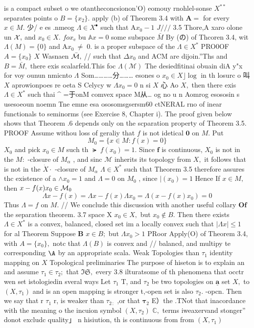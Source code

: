 is a compact subset o we otantheconcsionon'O) eomouy rnohlel-sonse $X^{\ast\ast}$ separates points o $B=\{x_{2}\}.$ apply (b) of Theorem 3.4 with ${\boldsymbol{A}}=$ for every $x\in M.$ 少/ e es .nmeog $\Lambda\in X^{\bullet}$ such that $\mathrm{A}x_{0}-1$ $J/{\big/}/$ 3.5 Thore,A xaro olone un ${\cal X},$ and $x_{0}\in X.$ $\scriptstyle f o x_{\mathrm{e}}$ bu $\mathbb{A}x=0$ some subspace $\bar{M}$ By (の) of Thcoren 3.4, wit $\Lambda(M)=\{0\}$ and $\mathrm{A}{x_{0}}~\neq\;0.$ is a proper subspace of the $\Lambda\in X^{*}$ PRO0OF $A=\{x_{0}\}$ $\textstyle X$ Wasnaen $\bar{\cal M},$ // such that $\Delta x_{0}$ and ACM are dijoin.”Ths and $B={\bar{M}},$ there exis scalarfeld.This foc $\Lambda(\mathcal{M})$ The desiedfitinai obuain diA y"x for voy ounun nmicnto $\Lambda$ Som…………分……… esones o $x_{0}\in X\rfloor\log$ in th losurc o 叫 $\textstyle X$ aprowionpoes re oeta S Celycy w $\Lambda x_{0}=0$ n si $X$ 心 Ao $X,$ then there exis $\Lambda\in X^{*}$ such thai ^ =于onM comvex space M从… og no u n Aomrog esososin s usesoeoun noemn Tne emne esa ososomsgsersm60 ctNERAL rno of inear functionals to seminorms (see Exercise 8, Chapter i). The proof given below shows that Theorem .6 depends only on the scparation property of Theorem 3.5. PROOF Assume withou loss of geraliy that $\boldsymbol{\mathit{f}}$ is not idetical ${\boldsymbol{0}}$ on $M.$ Put $$ M_{0}=\{x\in M\colon f(x)=0\} $$ $X_{0}$ and pick $x_{0}\in M$ such th $\mathrm{\lat}\;f(x_{0})=1.$ Since $\boldsymbol{f}$ is continuous, $X_{0}$ is not in the $M{\mathrm{:}}$ -closure of $\scriptstyle M_{\alpha}$ , and sinc $\mathcal{M}$ inherits its topology from $X,$ it follows that is not in the ${\dot{X}}\cdotp$ -closure of $\scriptstyle M_{\alpha}$ $\Lambda\in X^{*}$ such that Theorem 3.5 therefore assures thc existence of a $\wedge x_{0}=1$ and $\Lambda=0$ on $M_{0}$ , since $|(x_{0})=1$ Hence If $x\in M,$ then $x-f(x)x_{0}\in{\cal M}_{0}$ $$ \Lambda x-f(x)=\Lambda x-f(x)\Lambda x_{0}=\Lambda(x-f(x)x_{0})=0 $$ Thus $\Lambda=f$ on $M.$ // We conclude this discussion with another useful collary $\mathbf{Of}$ the separation theorem. 3.7 space X $x_{0}\in X,$ but $x_{0}\notin B.$ Then there exists $\Lambda\in X^{*}$ is a convex, balanced, closed set im a locally convex such that $|\Lambda x|\leq1$ for al Theorem Suppose $\boldsymbol{B}$ $x\in B;$ but $\Lambda x_{0}>1$ PRoor Apply(O) of Theorem 3.4, with $A=\{x_{0}\},$ notc that $\Lambda(B)$ is convex and // balancd, and multipy te corresponding $\mathrm{\A}$ by an appropriate scala. Weak Topologies than $\tau_{1}$ identity mapping on $\textstyle{X}$ Topological preliminaries The purpose of hiseton is to explain an and assume $\tau_{1}\in\tau_{2};$ that ${\mathfrak{I S}},$ every 3.8 ilturatsome of th phenomena that occtr wen set istologiedin sveral ways Let $\tau_{1}$ T, and $\tau_{2}$ be two topologies on $\underline{{\mathbf{a}}}$ set $X,$ to $(X,\tau_{1})$ and is an open mapping is stronger t,-open set is also $\tau_{2}.$ -opcn. Then we say that r $\tau_{1}$ r, is weaker than $\tau_{2\,:}$ ,or that ${\boldsymbol{\tau}}_{2}$ E）the .TNot that inacordance with the meaning o the incuion symbol $(X,\tau_{2})$ $\mathbb{C},$ terms iweaxervand stonger” donot excludc quality」 n hisiution, th is continuous from from $(X,\tau_{1})$ 